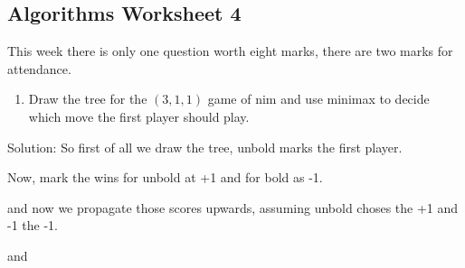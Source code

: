 \documentclass[11pt,a4paper]{scrartcl}
\newif\ifanswers
\begin{document}
\subsection*{Algorithms Worksheet 4}

This week there is only one question worth eight marks, there are two
marks for attendance.

\begin{enumerate}

\item Draw the tree for the $(3,1,1)$ game of nim and use minimax to decide which move the first player should play.
\end{enumerate}

\ifanswers

\noindent Solution:
So first of all we draw the tree, unbold marks the first player.
\begin{center}
\end{center}
Now, mark the wins for unbold at +1 and for bold as -1.
\begin{center}
\end{center}
and now we propagate those scores upwards, assuming unbold choses the +1 and -1 the -1.
\begin{center}
\end{center}
and
\end{document}
